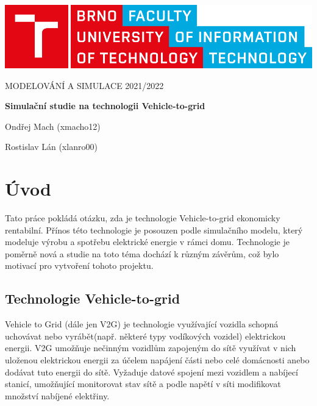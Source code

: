 \documentclass[12pt,a4paper]{Cotmas-2018}
\begin{document}
\begin{titlepage}
\begin{center}
\includegraphics[width=0.5\linewidth]{img/logo.pdf}
\vspace{3cm}

\LARGE\uppercase{Modelování a simulace 2021/2022}
\vspace{1cm}

\LARGE\textbf{Simulační studie na technologii Vehicle-to-grid}

\vspace*{\fill}
\large{Ondřej Mach (xmacho12)}

\large{Rostislav Lán (xlanro00)}

\end{center}
\end{titlepage}


\setcounter{page}{1}
\tableofcontents
\clearpage


\section{Úvod}
Tato práce pokládá otázku, zda je technologie Vehicle-to-grid ekonomicky rentabilní.
Přínos této technologie je posouzen podle simulačního modelu, který modeluje výrobu a spotřebu elektrické energie v rámci domu.
Technologie je poměrně nová a studie na toto téma dochází k různým závěrům, což bylo motivací pro vytvoření tohoto projektu.

\subsection{Technologie Vehicle-to-grid}
Vehicle to Grid (dále jen V2G) je technologie využívající vozidla schopná uchovávat nebo vyrábět(např. některé typy vodíkových vozidel) elektrickou energii. V2G umožňuje nečinným vozidlům zapojeným do sítě využívat v nich uloženou elektrickou energii  za účelem napájení části nebo celé domácnosti anebo dodávat tuto energii do sítě.
Vyžaduje datové spojení mezi vozidlem a nabíjecí stanicí, umožňující monitorovat stav sítě a podle napětí v síti modifikovat množství nabíjené elektřiny.
\end{document}
